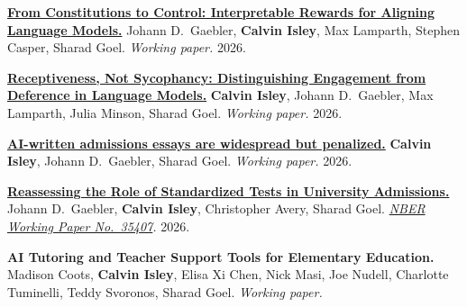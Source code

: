\documentclass[11pt]{article}
\begin{document}
\begin{enumerate}[leftmargin=2.2em, label={[\arabic*]}, itemsep=5pt, topsep=0pt]

  \item \textbf{\href{https://arxiv.org/abs/2609.33086}{From Constitutions to Control: Interpretable Rewards for Aligning Language Models.}}
  Johann D.\ Gaebler, \textbf{Calvin Isley}, Max Lamparth, Stephen Casper, Sharad Goel.
  \textit{Working paper.} 2026.

  \item \textbf{\href{https://arxiv.org/abs/2609.26579}{Receptiveness, Not Sycophancy: Distinguishing Engagement from Deference in Language Models.}}
  \textbf{Calvin Isley}, Johann D.\ Gaebler, Max Lamparth, Julia Minson, Sharad Goel.
  \textit{Working paper.} 2026.

  \item \textbf{\href{https://arxiv.org/abs/2609.22549}{AI-written admissions essays are widespread but penalized.}}
  \textbf{Calvin Isley}, Johann D.\ Gaebler, Sharad Goel.
  \textit{Working paper.} 2026.

  \item \textbf{\href{https://www.nber.org/papers/w35407}{Reassessing the Role of Standardized Tests in University Admissions.}}
  Johann D.\ Gaebler, \textbf{Calvin Isley}, Christopher Avery, Sharad Goel.
  \textit{\href{https://www.nber.org/papers/w35407}{NBER Working Paper No.\ 35407}.} 2026.

  \item \textbf{AI Tutoring and Teacher Support Tools for Elementary Education.}
  Madison Coots, \textbf{Calvin Isley}, Elisa Xi Chen, Nick Masi, Joe Nudell,
  Charlotte Tuminelli, Teddy Svoronos, Sharad Goel.
  \textit{Working paper.}

\end{enumerate}

%

\end{document}
